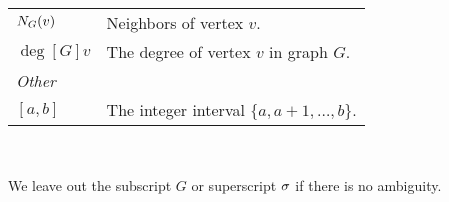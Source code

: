 \begin{centering}
\begin{tabular}{l p{} l}
    $\N[G]{v}$ & \multicolumn{2}{l}{Neighbors of vertex $v$.}
    \vspace{\tablespace}\\

    $\deg[G]{v}$ & \multicolumn{2}{p{.815\textwidth}}{The degree of vertex $v$
      in graph $G$.} \vspace{\tablespace}\\

    \toprule
    \multicolumn{3}{l}{\emph{Other}} \\
    \midrule

    $[a,b]$ & \multicolumn{2}{l}{The integer interval $\{a, a+1, \dots, b\}$.}
    \vspace{2\tablespace}
  \end{tabular}\\
\end{centering}
\hidegame

We leave out the subscript $G$ or superscript $\sigma$ if there is no ambiguity.
